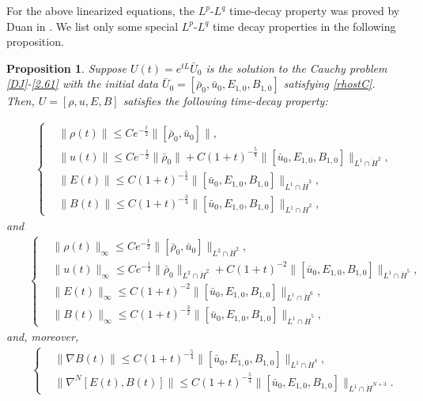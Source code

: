 \documentclass[11pt]{amsart}
\newtheorem{proposition}{Proposition}[section]
\numberwithin{equation}{section}
\begin{document}
For the above linearized equations, the $L^{p}$-$L^{q}$ time-decay
property was proved by Duan in \cite{Duan}. We  list only some
special $L^{p}$-$L^{q}$ time decay properties  in the following
proposition.
\begin{proposition}\label{thm.decay}
 Suppose $U(t)=e^{tL}\bar{U}_{0}$ is the solution
to the Cauchy problem \eqref{DJ}-\eqref{2.61} with the initial data
$\bar{U}_{0}=[\bar{\rho}_{0},\bar{u}_{0},E_{1,0},B_{1,0}] $
satisfying \eqref{rhostC}. Then, $U=[\rho,u,E,B]$ satisfies the
following time-decay property:

\begin{eqnarray}\label{col.decay1}
 && \left\{
 \begin{aligned}
 & \|\rho(t)\|\leq C e^{-\frac{t}{2}}\|[\bar{\rho}_{0},\bar{u}_{0}]\|,\\
 & \|u(t)\| \leq C e^{-\frac{t}{2}}\|\bar{\rho}_{0}\|+C(1+t)^{-\frac{5}{4}}
 \|[\bar{u}_{0}, E_{1,0},B_{1,0}]\|_{L^1\cap \dot{H}^{2}},\\
 &\|E(t)\|\leq C (1+t)^{-\frac{5}{4}}
 \|[\bar{u}_{0}, E_{1,0},B_{1,0}]\|_{L^1\cap \dot{H}^{3}},\\
 &\|B(t)\|\leq C (1+t)^{-\frac{3}{4}}
 \|[\bar{u}_{0}, E_{1,0},B_{1,0}]\|_{L^1\cap \dot{H}^{2}},
\end{aligned}\right.
\end{eqnarray}
and
\begin{eqnarray}\label{col.decayinfty1}
 && \left\{
 \begin{aligned}
 & \|\rho(t)\|_{\infty}\leq C e^{-\frac{t}{2}}\|[\bar{\rho}_{0},\bar{u}_{0}]\|_{L^{2}\cap\dot{H}^{2}},\\
 & \|u(t)\|_{\infty} \leq C e^{-\frac{t}{2}}\|\bar{\rho}_{0}\|_{L^{2}\cap\dot{H}^{2}}+C(1+t)^{-2}
 \|[\bar{u}_{0}, E_{1,0},B_{1,0}]\|_{L^1\cap \dot{H}^{5}},\\
 &\|E(t)\|_{\infty}\leq C (1+t)^{-2}
 \|[\bar{u}_{0}, E_{1,0},B_{1,0}]\|_{L^1\cap \dot{H}^{6}},\\
 &\|B(t)\|_{\infty}\leq C (1+t)^{-\frac{3}{2}}
 \|[\bar{u}_{0}, E_{1,0},B_{1,0}]\|_{L^1\cap \dot{H}^{5}},
\end{aligned}\right.
\end{eqnarray}
and, moreover,
\begin{eqnarray}\label{col.EB}
 && \left\{
 \begin{aligned}
 &\|\nabla B(t)\|\leq C (1+t)^{-\frac{5}{4}}
 \|[\bar{u}_{0}, E_{1,0},B_{1,0}]\|_{ L^1 \cap \dot{H}^{4}},\\
 & \|\nabla^{N}[E(t),B(t)]\|\leq C(1+t)^{-\frac{5}{4}}
 \|[\bar{u}_{0}, E_{1,0},B_{1,0}]\|_{ L^1 \cap \dot{H}^{N+3}}.
\end{aligned}\right.
\end{eqnarray}

\end{proposition}
\end{document}
